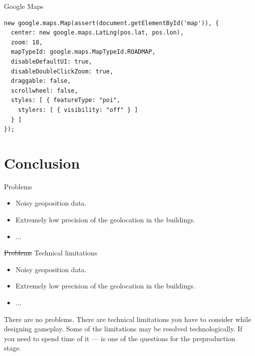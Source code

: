 \documentclass[aspectratio=169,handout,bigger]{beamer}
\newcommand{\soutt}[1]{%
    \renewcommand{\ULthickness}{1pt}%
       \sout{#1}%
    \renewcommand{\ULthickness}{.4pt}%
}
\begin{document}
\begin{frame}[fragile]{Google Maps}
\begin{verbatim}
new google.maps.Map(assert(document.getElementById('map')), {
  center: new google.maps.LatLng(pos.lat, pos.lon),
  zoom: 18,
  mapTypeId: google.maps.MapTypeId.ROADMAP,
  disableDefaultUI: true,
  disableDoubleClickZoom: true,
  draggable: false,
  scrollwheel: false,
  styles: [ { featureType: "poi",
    stylers: [ { visibility: "off" } ]
  } ]
});
\end{verbatim}
\end{frame}


\section{Conclusion}


\begin{frame}{Problems}
  \begin{itemize}
    \item Noisy geoposition data.
    \item Extremely low precision of the geolocation in the buildings.
    \item ...
  \end{itemize}
\end{frame}


\begin{frame}{\soutt{Problems} Technical limitations}
  \begin{itemize}
    \item Noisy geoposition data.
    \item Extremely low precision of the geolocation in the buildings.
    \item ...
  \end{itemize}

  There are no problems. There are technical limitations you have to
  consider while designing gameplay. Some of the limitations may be
  resolved technologically. If you need to spend time of it --- is one
  of the questions for the preproduction stage.
\end{frame}

\end{document}
